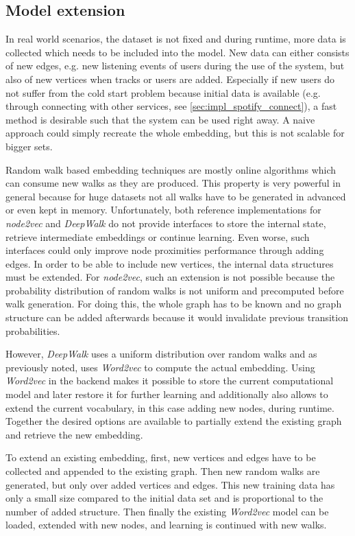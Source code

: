 \documentclass[sigconf]{acmart}
\begin{document}
\subsection{Model extension}
In real world scenarios, the dataset is not fixed and during runtime, more data is collected which needs to be included into the model. New data can either consists of new edges, e.g. new listening events of users during the use of the system, but also of new vertices when tracks or users are added. Especially if new users do not suffer from the cold start problem because initial data is available (e.g. through connecting with other services, see \ref{sec:impl_spotify_connect}), a fast method is desirable such that the system can be used right away. A naive approach could simply recreate the whole embedding, but this is not scalable for bigger sets. 

Random walk based embedding techniques are mostly online algorithms which can consume new walks as they are produced. This property is very powerful in general because for huge datasets not all walks have to be generated in advanced or even kept in memory. Unfortunately, both reference implementations for \emph{node2vec} and \emph{DeepWalk} do not provide interfaces to store the internal state, retrieve intermediate embeddings or continue learning. Even worse, such interfaces could only improve node proximities performance through adding edges. In order to be able to include new vertices, the internal data structures must be extended. For \emph{node2vec}, such an extension is not possible because the probability distribution of random walks is not uniform and precomputed before walk generation. For doing this, the whole graph has to be known and no graph structure can be added afterwards because it would invalidate previous transition probabilities.

However, \emph{DeepWalk} uses a uniform distribution over random walks and as previously noted, uses \emph{Word2vec} to compute the actual embedding. Using  \emph{Word2vec} in the backend makes it possible to store the current computational model and later restore it for further learning and additionally also allows to extend the current vocabulary, in this case adding new nodes, during runtime. Together the desired options are available to partially extend the existing graph and retrieve the new embedding.

To extend an existing embedding, first, new vertices and edges have to be collected and appended to the existing graph. Then new random walks are generated, but only over added vertices and edges. This new training data has only a small size compared to the initial data set and is proportional to the number of added structure. Then finally the existing \emph{Word2vec} model can be loaded, extended with new nodes, and learning is continued with new walks. \\
\end{document}
